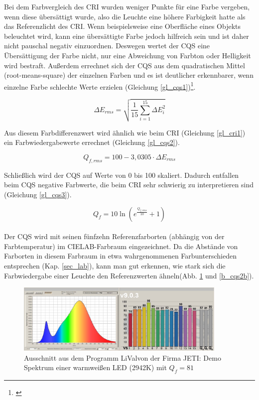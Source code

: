 Bei dem Farbvergleich des CRI wurden weniger Punkte für eine Farbe vergeben, wenn diese übersättigt wurde, also die Leuchte eine höhere Farbigkeit hatte als das Referenzlicht des CRI. Wenn beispielsweise eine Oberfläche eines Objekts beleuchtet wird, kann eine übersättigte Farbe jedoch hilfreich sein und ist daher nicht pauschal negativ einzuordnen. Deswegen wertet der CQS eine Übersättigung der Farbe nicht, nur eine Abweichung von Farbton oder Helligkeit wird bestraft. Außerdem errechnet sich der CQS aus dem quadratischen Mittel (root-means-square) der einzelnen Farben und es ist deutlicher erkennbarer, wenn einzelne Farbe schlechte Werte erzielen (Gleichung \ref{gl_cqs1})\footnote{\cite{davis_ohno}}.

\begin{equation}\label{gl_cqs1}
		\Delta E_{rms} = \sqrt{\frac{1}{15} \sum_{i=1}^{15} \Delta E_{i} ^{2}} 
\end{equation}

Aus diesem Farbdifferenzwert wird ähnlich wie beim CRI (Gleichung \ref{gl_cri1}) ein Farbwiedergabewerte errechnet (Gleichung \ref{gl_cqs2}).

\begin{equation}\label{gl_cqs2}
		Q_{f,rms} = 100 - 3,0305 \cdot \Delta E_{rms} 
\end{equation}

Schließlich wird der CQS auf Werte von 0 bis 100 skaliert. Dadurch entfallen beim CQS negative Farbwerte, die beim CRI sehr schwierig zu interpretieren sind (Gleichung \ref{gl_cqs3}). 

\begin{equation}\label{gl_cqs3}
		Q_{f} = 10 \ln(e^{\frac{Q_{f,rms}}{10}}+1) 
\end{equation}\\

Der CQS wird mit seinen fünfzehn Referenzfarborten (abhängig von der Farbtemperatur) im CIELAB-Farbraum eingezeichnet. Da die Abstände von Farborten in diesem Farbraum in etwa wahrgenommenen Farbunterschieden entsprechen (Kap. \ref{sec_lab}), kann man gut erkennen, wie stark sich die Farbwiedergabe einer Leuchte den Referenzwerten ähneln(Abb. \ref{b_cqs2a} und \ref{b_cqs2b}).\\

\begin{figure}[htp]     %
\centering
\includegraphics[width=0.9\textwidth]{bilder/cqs2a} 
\caption {Ausschnitt aus dem Programm \glqq LiVal\grqq von der Firma JETI: Demo Spektrum einer warmweißen LED (2942K) mit $Q_{f} = 81$}\label{b_cqs2a}
\end{figure}

